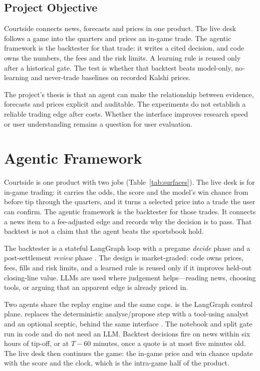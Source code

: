 \documentclass[11pt,a4paper]{article}
\newcommand{\code}[1]{\path{#1}}
\begin{document}
\subsection{Project Objective}
Courtside connects news, forecasts and prices in one product. The live desk
follows a game into the quarters and prices an in-game trade. The agentic
framework is the backtester for that trade: it writes a cited decision, and
code owns the numbers, the fees and the risk limits. A learning rule is reused
only after a historical gate. The test is whether that backtest beats
model-only, no-learning and never-trade baselines on recorded Kalshi prices.

The project's thesis is that an agent can make the relationship between
evidence, forecasts and prices explicit and auditable. The experiments do not
establish a reliable trading edge after costs. Whether the interface improves
research speed or user understanding remains a question for user evaluation.

\section{Agentic Framework}
\label{sec:framework}
Courtside is one product with two jobs (Table~\ref{tab:surfaces}). The live
desk is for in-game trading: it carries the odds, the score and the model's
win chance from before tip through the quarters, and it turns a selected
price into a trade the user can confirm. The agentic framework is the
backtester for those trades. It connects a news item to a fee-adjusted edge
and records why the decision is to pass. That backtest is not a claim that
the agent beats the sportsbook hold.

The backtester is a stateful LangGraph loop with a pregame \emph{decide}
phase and a post-settlement \emph{review} phase \cite{langgraph,react}. The
design is market-graded: code owns prices, fees, fills and risk limits, and a
learned rule is reused only if it improves held-out closing-line value. LLMs
are used where judgement helps---reading news, choosing tools, or arguing
that an apparent edge is already priced in.

Two agents share the replay engine and the same caps.
\code{MarketAgent} is the LangGraph control plane.
\code{ToolAgent} replaces the deterministic analyse/propose step with a
tool-using analyst and an optional sceptic, behind the same
\code{policy(view, game, now)} interface \cite{llm-evaluation}.
The notebook and split gate run in code and do not need an LLM.
Backtest decisions fire on news within six hours of tip-off, or at $T-60$
minutes, once a quote is at most five minutes old. The live desk then
continues the game: the in-game price and win chance update with the score
and the clock, which is the intra-game half of the product.
\end{document}

